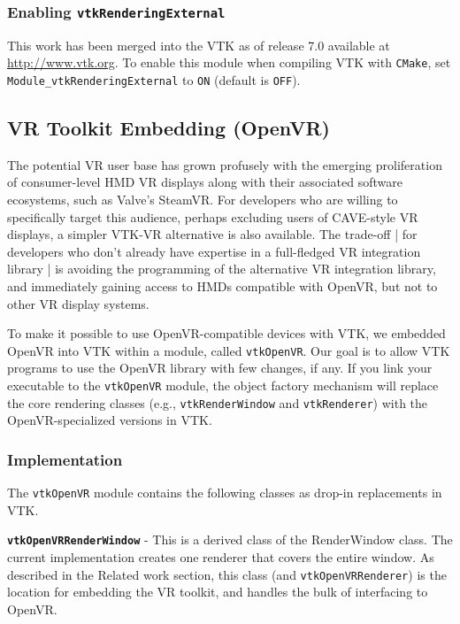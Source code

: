 \subsubsection{Enabling \texttt{vtkRenderingExternal}}

This work has been merged into the VTK as of release 7.0 available at
\url{http://www.vtk.org}.
To enable this module when compiling VTK with \texttt{CMake},
set \texttt{Module\_vtkRenderingExternal} to \texttt{ON} (default is \texttt{OFF}).

\subsection{VR Toolkit Embedding (OpenVR)}

The potential VR user base has grown profusely with the emerging
proliferation of consumer-level HMD VR displays along with their associated
software ecosystems, such as Valve's SteamVR.
For developers who are willing to specifically target this audience, perhaps
excluding users of CAVE-style VR displays, a simpler VTK-VR alternative is
also available.
The trade-off | for developers who don't already have expertise in a
full-fledged VR integration library | is avoiding the programming of
the alternative VR integration library, and immediately gaining access
to HMDs compatible with OpenVR, but not to other VR display systems.

To make it possible to use OpenVR-compatible devices with VTK, we embedded OpenVR into VTK within a module, called \texttt{vtkOpenVR}.
Our goal is to allow VTK programs to use the OpenVR library with few changes, if any.
If you link your executable to the \texttt{vtkOpenVR} module, the object factory
mechanism will replace the core rendering classes (e.g.,
\texttt{vtkRenderWindow} and \texttt{vtkRenderer}) with the OpenVR-specialized versions in VTK. 

\subsubsection{Implementation}

The \texttt{vtkOpenVR} module contains the following classes as drop-in replacements in VTK.

\textbf{\texttt{vtkOpenVRRenderWindow}} - This is a derived class of the RenderWindow class.
The current implementation creates one renderer that covers the entire window.
As described in the Related work section, this class (and \texttt{vtkOpenVRRenderer}) is the location for embedding the VR toolkit, and handles the bulk of interfacing to OpenVR. 

